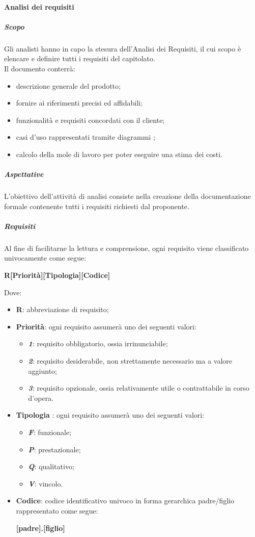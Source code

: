 			\paragraph{Analisi dei requisiti}
				\subparagraph{Scopo}
				Gli analisti hanno in capo la stesura dell'Analisi dei Requisiti, il cui scopo è elencare e definire tutti i requisiti del capitolato.
				\\ 
				Il documento conterrà:
				\begin{itemize}
					\item descrizione generale del prodotto;
					\item fornire ai  riferimenti precisi ed affidabili;
					\item funzionalità e requisiti concordati con il cliente;
					\item casi d'uso rappresentati tramite diagrammi ;	
					\item calcolo della mole di lavoro per poter eseguire una stima dei costi.			
				\end{itemize}
				\subparagraph{Aspettative}
				L'obiettivo dell'attività di analisi consiste nella creazione della documentazione formale contenente tutti i requisiti richiesti dal proponente.
				\subparagraph{Requisiti}
				Al fine di facilitarne la lettura e comprensione, ogni requisito viene classificato univocamente come segue:				
				\begin{center}
					\textbf{R[Priorità][Tipologia][Codice]}
				\end{center}
				Dove:
				\begin{itemize}
					\item \textbf{R}: abbreviazione di requisito;
					\item \textbf{Priorità}: ogni requisito assumerà uno dei seguenti valori:
					\begin{itemize}
						\item \textbf{\textit{1}}: requisito obbligatorio, ossia irrinunciabile;
						\item \textbf{\textit{2}}: requisito desiderabile, non strettamente necessario ma a valore aggiunto;
						\item \textbf{\textit{3}}: requisito opzionale, ossia relativamente utile o contrattabile in corso d'opera.
					\end{itemize}
					\item \textbf{Tipologia} : ogni requisito assumerà uno dei seguenti valori:
					\begin{itemize}
						\item \textbf{\textit{F}}: funzionale;
						\item \textbf{\textit{P}}: prestazionale;
						\item \textbf{\textit{Q}}: qualitativo;
						\item \textbf{\textit{V}}: vincolo.
					\end{itemize}
					\item \textbf{Codice}: codice identificativo univoco in forma gerarchica padre/figlio rappresentato come segue:
					\begin{center}
						\textbf{[padre].[figlio]}
					\end{center}
				\end{itemize}				
